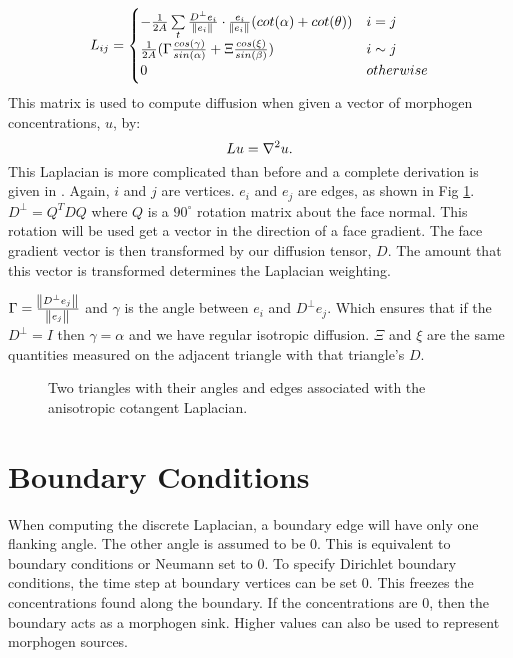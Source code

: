 \[ 
   L_{ij} =
   \begin{cases} 
      -\frac{1}{2A}\sum\limits_{t} \frac{D^\perp e_i}{\norm{e_i}} \cdot \frac{e_i}{\norm{e_i}}(cot(\alpha)+cot(\theta))  & i = j \\
      \frac{1}{2A}(\Gamma \frac{cos(\gamma)}{sin(\alpha)} + \Xi\frac{cos(\xi)}{sin(\beta)})   & i \sim j \\
      0 & otherwise
   \end{cases}
\]
This matrix is used to compute diffusion when given a vector of morphogen concentrations, $u$, by:
\[
	Lu = \nabla^2 u.
\]
This Laplacian is more complicated than before and a complete derivation is given in \citep{AndreuxMathieu2014}. Again, $i$ and $j$ are vertices. $e_i$ and $e_j$ are edges, as shown in Fig \ref{fig:meshLaplacian}. $D^\perp = Q^T D Q$ where $Q$ is a $90^\circ$ rotation matrix about the face normal. This rotation will be used get a vector in the direction of a face gradient. The face gradient vector is then transformed by our diffusion tensor, $D$. The amount that this vector is transformed determines the Laplacian weighting. 

$\Gamma = \frac{\norm{D^\perp e_j}}{\norm{e_j}}$ and $\gamma$ is the angle between $e_i$ and $D^\perp e_j$. Which ensures that if the $D^{\perp} = I$ then $\gamma = \alpha$ and we have regular isotropic diffusion. $\Xi$ and $\xi$ are the same quantities measured on the adjacent triangle with that triangle's $D$. 

\begin{figure}[H]
	\centering
	\caption{Two triangles with their angles and edges associated with the anisotropic cotangent Laplacian.}
	\label{fig:meshLaplacian}
\end{figure}

\section{Boundary Conditions}
When computing the discrete Laplacian, a boundary edge will have only one flanking angle. The other angle is assumed to be 0. This is equivalent to  boundary conditions or Neumann set to 0. To specify Dirichlet boundary conditions, the time step at boundary vertices can be set 0. This freezes the concentrations found along the boundary. If the concentrations are 0, then the boundary acts as a morphogen sink. Higher values can also be used to represent morphogen sources.

